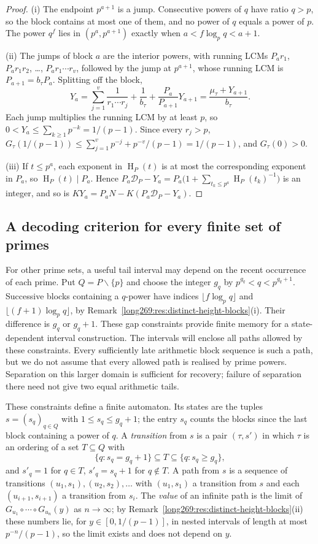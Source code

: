 \documentclass[11pt]{article}
\theoremstyle{remark}
\theoremstyle{plain}
\newcommand{\hgt}{\operatorname{H}}
\begin{document}
\begin{proof}
(i) The endpoint $p^{a+1}$ is a jump.  Consecutive powers of $q$ have ratio
$q>p$, so the block contains at most one of them, and no power of $q$ equals
a power of $p$.  The power $q^f$ lies in $(p^a,p^{a+1})$ exactly when
$a<f\log_pq<a+1$.

(ii) The jumps of block $a$ are the interior powers, with running LCMs
$P_ar_1$, $P_ar_1r_2$, \ldots, $P_ar_1\cdots r_v$, followed by the jump at
$p^{a+1}$, whose running LCM is $P_{a+1}=b_\tau P_a$.  Splitting off the block,
\[
 Y_a=\sum_{j=1}^{v}\frac1{r_1\cdots r_j}+\frac1{b_\tau}
    +\frac{P_a}{P_{a+1}}Y_{a+1}=\frac{\mu_\tau+Y_{a+1}}{b_\tau}.
\]
Each jump multiplies the running LCM by at least $p$, so
$0<Y_a\le\sum_{k\ge1}p^{-k}=1/(p-1)$.  Since every $r_j>p$,
$G_\tau(1/(p-1))\le\sum_{j=1}^{v}p^{-j}+p^{-v}/(p-1)=1/(p-1)$, and
$G_\tau(0)>0$.

(iii) If $t\le p^a$, each exponent in $\hgt_P(t)$ is at most the
corresponding exponent in $P_a$, so $\hgt_P(t)\mid P_a$.  Hence
$P_a\mathcal D_P-Y_a=P_a\bigl(1+\sum_{t_k\le p^a}\hgt_P(t_k)^{-1}\bigr)$ is
an integer, and so is $KY_a=P_aN-K(P_a\mathcal D_P-Y_a)$.
\end{proof}

\subsection{A decoding criterion for every finite set of primes}
\label{long269:sec:distinct-criterion}
For other prime sets, a useful tail interval may depend on the recent
occurrence of each prime. Put $Q=P\smallsetminus\{p\}$ and choose the
integer $g_q$ by $p^{g_q}<q<p^{g_q+1}$. Successive blocks containing a
$q$-power have indices $\lfloor f\log_p q\rfloor$ and
$\lfloor(f+1)\log_p q\rfloor$, by
Remark~\ref{long269:res:distinct-height-blocks}(i). Their difference is
$g_q$ or $g_q+1$. These gap constraints provide finite memory for a
state-dependent interval construction. The intervals will enclose all
paths allowed by these constraints. Every sufficiently late arithmetic
block sequence is such a path, but we do not assume that every allowed
path is realised by prime powers. Separation on this larger domain is
sufficient for recovery; failure of separation there need not give two
equal arithmetic tails.

These constraints define a finite automaton.  Its states are the tuples
$s=(s_q)_{q\in Q}$ with $1\le s_q\le g_q+1$; the entry $s_q$ counts the blocks
since the last block containing a power of $q$.  A \emph{transition} from $s$
is a pair $(\tau,s')$ in which $\tau$ is an ordering of a set $T\subseteq Q$
with
\[
 \{q:s_q=g_q+1\}\subseteq T\subseteq\{q:s_q\ge g_q\},
\]
and $s'_q=1$ for $q\in T$, $s'_q=s_q+1$ for $q\notin T$.  A path from $s$
is a sequence of transitions $(u_1,s_1),(u_2,s_2),\ldots$ with $(u_1,s_1)$ a
transition from $s$ and each $(u_{i+1},s_{i+1})$ a transition from $s_i$.
The \emph{value} of an infinite path is the limit of
$G_{u_1}\circ\cdots\circ G_{u_n}(y)$ as $n\to\infty$; by
Remark~\ref{long269:res:distinct-height-blocks}(ii) these numbers lie, for
$y\in[0,1/(p-1)]$, in nested intervals of length at most $p^{-n}/(p-1)$, so
the limit exists and does not depend on $y$.
\end{document}
